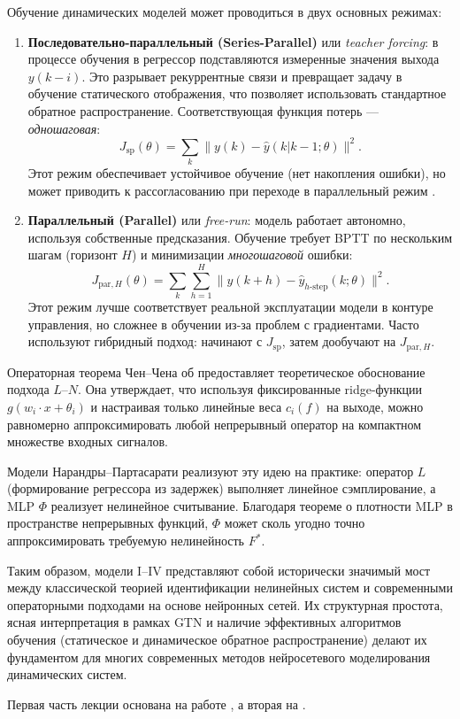 \documentclass[12pt]{article}
\begin{document}
Обучение динамических моделей может проводиться в двух основных режимах:

\begin{enumerate}
  \item \textbf{Последовательно-параллельный (Series-Parallel)} или \emph{teacher forcing}: в процессе обучения в регрессор подставляются измеренные значения выхода \(y(k-i)\). Это разрывает рекуррентные связи и превращает задачу в обучение статического отображения, что позволяет использовать стандартное обратное распространение. Соответствующая функция потерь --- \emph{одношаговая}:
        \[
          J_{\text{sp}}(\theta) = \sum_k \| y(k) - \hat{y}(k|k-1; \theta) \|^2.
        \]
        Этот режим обеспечивает устойчивое обучение (нет накопления ошибки), но может приводить к рассогласованию при переходе в параллельный режим \cite{Narendra1990}.

  \item \textbf{Параллельный (Parallel)} или \emph{free-run}: модель работает автономно, используя собственные предсказания. Обучение требует BPTT по нескольким шагам (горизонт \(H\)) и минимизации \emph{многошаговой} ошибки:
        \[
          J_{\text{par},H}(\theta) = \sum_{k} \sum_{h=1}^{H} \| y(k+h) - \hat{y}_{h\text{-step}}(k; \theta) \|^2.
        \]
        Этот режим лучше соответствует реальной эксплуатации модели в контуре управления, но сложнее в обучении из-за проблем с градиентами. Часто используют гибридный подход: начинают с \(J_{\text{sp}}\), затем дообучают на \(J_{\text{par},H}\).
\end{enumerate}

Операторная теорема Чен--Чена об  предоставляет теоретическое обоснование подхода \(L\)--\(N\). Она утверждает, что используя фиксированные ridge-функции \(g(w_i \cdot x + \theta_i)\) и настраивая только линейные веса \(c_i(f)\) на выходе, можно равномерно аппроксимировать любой непрерывный оператор на компактном множестве входных сигналов.

Модели Нарандры–Партасарати реализуют эту идею на практике: оператор \(L\) (формирование регрессора из задержек) выполняет линейное сэмплирование, а MLP \(\Phi\) реализует нелинейное считывание. Благодаря теореме о плотности MLP в пространстве непрерывных функций, \(\Phi\) может сколь угодно точно аппроксимировать требуемую нелинейность \(F^*\).

Таким образом, модели I–IV представляют собой исторически значимый мост между классической теорией идентификации нелинейных систем и современными операторными подходами на основе нейронных сетей. Их структурная простота, ясная интерпретация в рамках GTN и наличие эффективных алгоритмов обучения (статическое и динамическое обратное распространение) делают их фундаментом для многих современных методов нейросетевого моделирования динамических систем.

Первая часть лекции основана на работе \cite{Mhaskar1997}, а вторая на \cite{Narendra1990}.


\printbibliography
\end{document}
